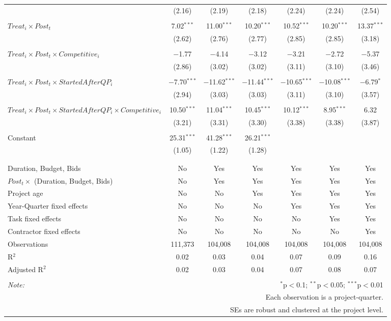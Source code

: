 \documentclass[
]{article}
\begin{document}
\begin{table}[H]
\begin{tabular}{@{\extracolsep{-3pt}}lcccccc}
  & (2.16) & (2.19) & (2.18) & (2.24) & (2.24) & (2.54) \\ 
  & & & & & & \\ 
 $Treat_i \times Post_t$ & 7.02$^{***}$ & 11.00$^{***}$ & 10.20$^{***}$ & 10.52$^{***}$ & 10.20$^{***}$ & 13.37$^{***}$ \\ 
  & (2.62) & (2.76) & (2.77) & (2.85) & (2.85) & (3.18) \\ 
  & & & & & & \\ 
 $Treat_i \times Post_t \times Competitive_i$ & $-$1.77 & $-$4.14 & $-$3.12 & $-$3.21 & $-$2.72 & $-$5.37 \\ 
  & (2.86) & (3.02) & (3.02) & (3.11) & (3.10) & (3.46) \\ 
  & & & & & & \\ 
 $Treat_i \times Post_t \times StartedAfterQP_i$ & $-$7.70$^{***}$ & $-$11.62$^{***}$ & $-$11.44$^{***}$ & $-$10.65$^{***}$ & $-$10.08$^{***}$ & $-$6.79$^{*}$ \\ 
  & (2.94) & (3.03) & (3.03) & (3.11) & (3.10) & (3.57) \\ 
  & & & & & & \\ 
 $Treat_i \times Post_t \times StartedAfterQP_i \times Competitive_i$ & 10.50$^{***}$ & 11.04$^{***}$ & 10.45$^{***}$ & 10.12$^{***}$ & 8.95$^{***}$ & 6.32 \\ 
  & (3.21) & (3.31) & (3.30) & (3.38) & (3.38) & (3.87) \\ 
  & & & & & & \\ 
 Constant & 25.31$^{***}$ & 41.28$^{***}$ & 26.21$^{***}$ &  &  &  \\ 
  & (1.05) & (1.22) & (1.28) &  &  &  \\ 
  & & & & & & \\ 
\hline \\[-1.8ex] 
Duration, Budget, Bids & No & Yes & Yes & Yes & Yes & Yes \\ 
$Post_t \times $  (Duration, Budget, Bids) & No & Yes & Yes & Yes & Yes & Yes \\ 
Project age & No & No & Yes & Yes & Yes & Yes \\ 
Year-Quarter fixed effects & No & No & No & Yes & Yes & Yes \\ 
Task fixed effects & No & No & No & No & Yes & Yes \\ 
Contractor fixed effects & No & No & No & No & No & Yes \\ 
Observations & 111,373 & 104,008 & 104,008 & 104,008 & 104,008 & 104,008 \\ 
R$^{2}$ & 0.02 & 0.03 & 0.04 & 0.07 & 0.09 & 0.16 \\ 
Adjusted R$^{2}$ & 0.02 & 0.03 & 0.04 & 0.07 & 0.08 & 0.07 \\ 
\hline 
\hline \\[-1.8ex] 
\textit{Note:}  & \multicolumn{6}{r}{$^{*}$p$<$0.1; $^{**}$p$<$0.05; $^{***}$p$<$0.01} \\ 
 & \multicolumn{6}{r}{Each observation is a project-quarter.} \\ 
 & \multicolumn{6}{r}{SEs are robust and clustered at the project level.} \\ 
\end{tabular} 
\end{table}
\end{document}
